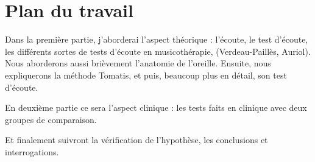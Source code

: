 \section{Plan du travail}

Dans la première partie, j'aborderai l'aspect théorique : l'écoute, le test d'écoute, les différents sortes de tests d'écoute en musicothérapie, (Verdeau-Paillès, Auriol). Nous aborderons aussi brièvement l'anatomie de l'oreille. Ensuite, nous expliquerons la méthode Tomatis,
et puis, beaucoup plus en détail, son test d'écoute.

En deuxième partie ce sera l'aspect clinique : les tests faits en clinique avec deux groupes de
comparaison.

Et finalement suivront la vérification de l'hypothèse, les conclusions et interrogations.
